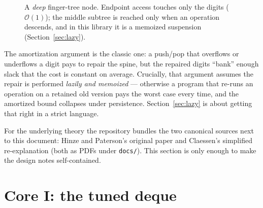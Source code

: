 \documentclass[11pt]{article}
\newcommand{\bigO}{\ensuremath{\mathcal{O}}}
\begin{document}
\begin{figure}[h]
\centering
{}
\caption{A \emph{deep} finger-tree node. Endpoint access touches only the digits ($\bigO(1)$); the
middle subtree is reached only when an operation descends, and in this library it is a memoized
suspension (Section~\ref{sec:lazy}).}
\label{fig:deep}
\end{figure}

The amortization argument is the classic one: a push/pop that overflows or underflows a digit pays to
repair the spine, but the repaired digits ``bank'' enough slack that the cost is constant on average.
Crucially, that argument assumes the repair is performed \emph{lazily and memoized} --- otherwise a
program that re-runs an operation on a retained old version pays the worst case every time, and the
amortized bound collapses under persistence. Section~\ref{sec:lazy} is about getting that right in a
strict language.

For the underlying theory the repository bundles the two canonical sources next to this document: Hinze
and Paterson's original paper and Claessen's simplified re-explanation (both as PDFs under
\texttt{docs/}). This section is only enough to make the design notes self-contained.

\section{Core I: the tuned deque}
\label{sec:deque}
\end{document}
